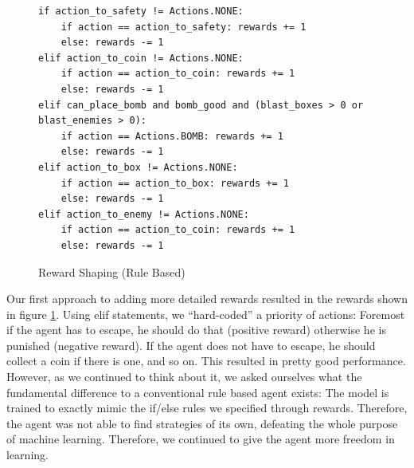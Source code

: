 \documentclass{article}
\begin{document}
\begin{figure}[h]
\centering
\begin{verbatim}
if action_to_safety != Actions.NONE:
    if action == action_to_safety: rewards += 1
    else: rewards -= 1
elif action_to_coin != Actions.NONE:
    if action == action_to_coin: rewards += 1
    else: rewards -= 1
elif can_place_bomb and bomb_good and (blast_boxes > 0 or blast_enemies > 0):
    if action == Actions.BOMB: rewards += 1
    else: rewards -= 1
elif action_to_box != Actions.NONE:
    if action == action_to_box: rewards += 1
    else: rewards -= 1
elif action_to_enemy != Actions.NONE:
    if action == action_to_coin: rewards += 1
    else: rewards -= 1
\end{verbatim}
\caption{Reward Shaping (Rule Based)}
\label{code:reward_shaping_1}
\end{figure}

Our first approach to adding more detailed rewards resulted in the rewards shown in figure \ref{code:reward_shaping_1}. Using elif statements, we “hard-coded” a priority of actions: Foremost if the agent has to escape, he should do that (positive reward) otherwise he is punished (negative reward). If the agent does not have to escape, he should collect a coin if there is one, and so on. This resulted in pretty good performance. However, as we continued to think about it, we asked ourselves what the fundamental difference to a conventional rule based agent exists: The model is trained to exactly mimic the if/else rules we specified through rewards. Therefore, the agent was not able to find strategies of its own, defeating the whole purpose of machine learning. Therefore, we continued to give the agent more freedom in learning.
\end{document}
